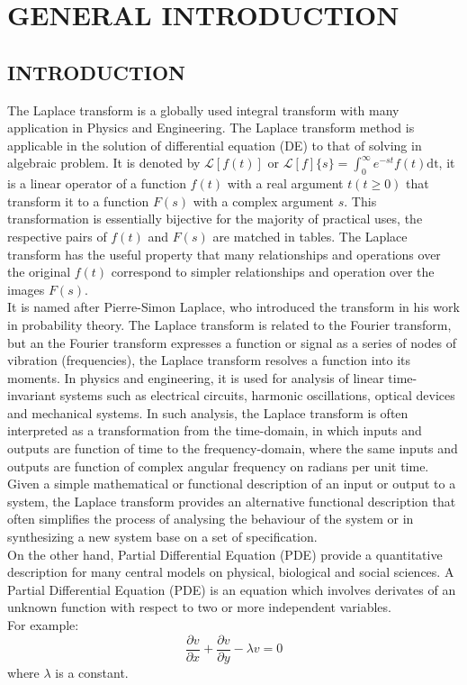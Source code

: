 \documentclass[11pt]{report}
\newcommand{\Laplace}{\mathcal{L}}
\newcommand{\ft}{f(t)}
\newcommand{\Fs}{F(s)}
\newcommand{\LaplaceIntegral}{\int_{0}^{\infty}e^{-st}\ft\text{dt}}
\newcommand{\sbracket}[1]{\left[#1\right]}
\newcommand{\LFt}{\Laplace \sbracket{\ft}}
\newcommand{\LFn}[1]{\Laplace \sbracket{#1}}
\newcommand{\sps}{\\[0.2cm]}
\newcommand{\dsp}{\displaystyle}
\newcommand{\PDe}{Partial Differential Equation }
\begin{document}
	\newpage
	\chapter{GENERAL INTRODUCTION}
	
	\section{INTRODUCTION}
	The Laplace transform is a globally used integral transform with many application in Physics and Engineering. The Laplace transform method is applicable in the solution of differential equation (DE) to that of solving in algebraic problem. It is denoted by $\LFt$ or $\dsp\LFn{f}\{s\} = \LaplaceIntegral$, it is a linear operator of a function $\ft$ with a real argument $t(t\geq 0)$ that transform it to a function $\Fs$ with a complex argument $s$. This transformation is essentially bijective for the majority of practical uses, the respective pairs of $\ft$ and $\Fs$ are matched in tables. The Laplace transform has the useful property that many relationships and operations over the original $\ft$ correspond to simpler relationships and operation over the images $\Fs$.\\
	
	It is named after Pierre-Simon Laplace, who introduced the transform in his work in probability theory. The Laplace transform is related to the Fourier transform, but an the Fourier transform expresses a function or signal as a series of nodes of vibration (frequencies), the Laplace transform resolves a function into its moments. In physics and engineering, it is used for analysis of linear time-invariant systems such as electrical circuits, harmonic oscillations, optical devices and mechanical systems. In such analysis, the Laplace transform is often interpreted as a transformation from the time-domain, in which inputs and outputs are function of time to the frequency-domain, where the same inputs and outputs are function of complex angular frequency on radians per unit time. Given a simple mathematical or functional description of an input or output to a system, the Laplace transform provides an alternative functional description that often simplifies the process of analysing the behaviour of the system or in synthesizing a new system base on a set of specification.\\
	
	On the other hand, \PDe (PDE) provide a quantitative description for many central models on physical, biological and social sciences. A \PDe (PDE) is an equation which involves derivates of an unknown function with respect to two or more independent variables.\sps
	For example:
	\begin{equation}
		\frac{\partial v}{\partial x} + \frac{\partial v}{\partial y} - \lambda v = 0
		\label{eq:1_1}
	\end{equation}
	where $\lambda$ is a constant.\sps
	
\end{document}
